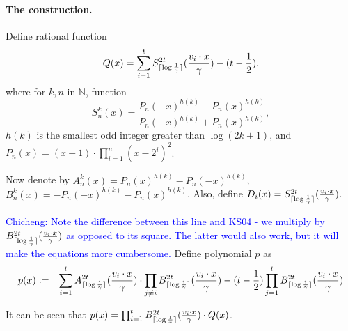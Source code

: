 \documentclass{article}
\DeclarePairedDelimiter\ceil{\lceil}{\rceil}
\newcommand{\field}[1]{\mathbb{#1}}
\newcommand{\fN}{\field{N}}
\newcommand{\cz}[1]{\textcolor{blue}{Chicheng: #1}}
\begin{document}
\paragraph{The construction.} Define rational function
\[
  Q(x) = \sum_{i=1}^t S_{\ceil{\log \frac 1 \gamma}}^{2t}(\frac{v_i \cdot x}{\gamma}) - (t - \frac 1 2).
\]
where for $k,n$ in $\fN$, function
\[
S_n^k(x) = \frac{P_n(-x)^{h(k)} - P_n(x)^{h(k)}}{P_n(-x)^{h(k)} + P_n(x)^{h(k)}},
\]
$h(k)$ is the smallest odd integer greater than $\log(2k+1)$, and $P_n(x) = (x - 1) \cdot \prod_{i=1}^n (x - 2^i)^2$.

Now denote by $A_n^k(x) = P_n(x)^{h(k)} - P_n(-x)^{h(k)}$, $B_n^k(x) = -P_n(-x)^{h(k)} - P_n(x)^{h(k)}$.
Also, define $D_i(x) = S_{\ceil{\log \frac 1 \gamma}}^{2t}(\frac{v_i \cdot x}{\gamma})$.

\cz{Note the difference between this line and KS04 - we multiply by $B_{\ceil{\log \frac 1 \gamma}}^{2t}(\frac{v_i \cdot x}\gamma)$ as opposed to its square. The latter would also work, but it will make the equations more cumbersome.}
Define polynomial $p$ as
\begin{eqnarray*}
  p(x) &:=& \sum_{i=1}^t A_{\ceil{\log \frac 1 \gamma}}^{2t}(\frac{v_i \cdot x}{\gamma}) \cdot \prod_{j \neq i} B_{\ceil{\log \frac 1 \gamma}}^{2t}(\frac{v_i \cdot x}{\gamma}) - (t-\frac12) \prod_{j=1}^t B_{\ceil{\log \frac 1 \gamma}}^{2t}(\frac{v_i \cdot x}{\gamma})
\end{eqnarray*}

It can be seen that
$p(x) = \prod_{i=1}^t B_{\ceil{\log \frac 1 \gamma}}^{2t}(\frac{v_i \cdot x}\gamma) \cdot Q(x)$.
\end{document}

